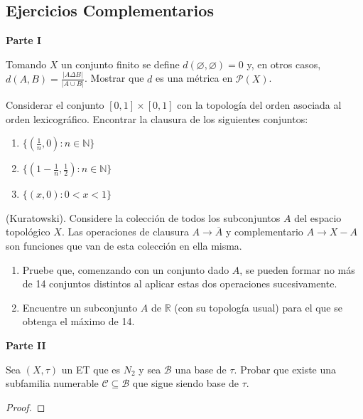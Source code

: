 \documentclass{article}
\theoremstyle{definition}
\newcommand{\R}{\mathbb{R}}
\newcommand{\N}{\mathbb{N}}
\newcommand{\cl}[1]{\overline{#1}}              %
\newenvironment{ejercicio}[1]{\begin{trivlist}
\item[\hskip \labelsep {\bfseries Ejercicio}\hskip \labelsep {\bfseries #1.}]}{\end{trivlist}}
\begin{document}
\clearpage

\subsection*{Ejercicios Complementarios}

\textbf{Parte I}

\begin{ejercicio}{C1}
    Tomando \(X\) un conjunto finito se define \(d(\varnothing,\varnothing)=0\) y, en otros casos, \(d(A,B)=\frac{|A\Delta B|}{|A\cup B|}\). Mostrar que \(d\) es una métrica en \(\mathcal{P}(X)\).
\end{ejercicio}

\begin{ejercicio}{C2}
    Considerar el conjunto \([0,1]\times[0,1]\) con la topología del orden asociada al orden lexicográfico. Encontrar la clausura de los siguientes conjuntos:
    \begin{enumerate}
        \item \( \{(\frac{1}{n},0):n\in \N \} \)
        \item \( \{(1-\frac{1}{n},\frac{1}{2}):n\in \N \} \)
        \item \( \{(x,0):0<x<1\} \)
    \end{enumerate}
\end{ejercicio}

\begin{ejercicio}{C3}
    (Kuratowski). Considere la colección de todos los subconjuntos \(A\) del espacio topológico \(X\). Las operaciones de clausura \(A\rightarrow\cl{A}\) y complementario \(A\rightarrow X-A\) son funciones que van de esta colección en ella misma.
    \begin{enumerate}
        \item Pruebe que, comenzando con un conjunto dado \(A\), se pueden formar no más de 14 conjuntos distintos al aplicar estas dos operaciones sucesivamente.
        \item Encuentre un subconjunto \(A\) de \( \R \) (con su topología usual) para el que se obtenga el máximo de 14.
    \end{enumerate}
\end{ejercicio}

\textbf{Parte II}

\begin{ejercicio}{C1}
    Sea \((X, \tau)\) un ET que es \(N_{2}\) y sea \(\mathcal{B}\) una base de \( \tau \). Probar que existe una subfamilia numerable \(\mathcal{C}\subseteq\mathcal{B}\) que sigue siendo base de \( \tau \).
\end{ejercicio}
\begin{proof}

\end{proof}
\end{document}

